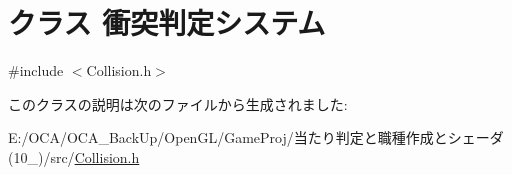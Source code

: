 \hypertarget{class_xE8_xA1_x9D_xE7_xAA_x81_xE5_x88_xA4_xE5_xAE_x9A_xE3_x82_xB7_xE3_x82_xB9_xE3_x83_x86_xE3_x83_xA0}{\section{クラス 衝突判定システム}
\label{class_xE8_xA1_x9D_xE7_xAA_x81_xE5_x88_xA4_xE5_xAE_x9A_xE3_x82_xB7_xE3_x82_xB9_xE3_x83_x86_xE3_x83_xA0}
}


{\ttfamily \#include $<$Collision.\-h$>$}



このクラスの説明は次のファイルから生成されました\-:\begin{DoxyCompactItemize}
\item 
E\-:/\-O\-C\-A/\-O\-C\-A\-\_\-\-Back\-Up/\-Open\-G\-L/\-Game\-Proj/当たり判定と職種作成とシェーダ(10\-\_)/src/\hyperlink{_collision_8h}{Collision.\-h}\end{DoxyCompactItemize}

